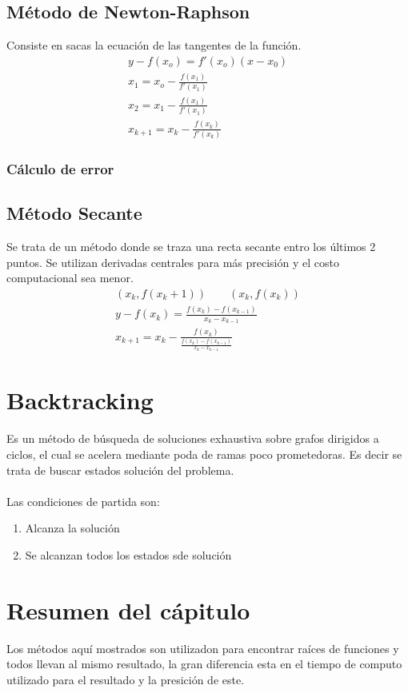 \subsection{M\'etodo de Newton-Raphson}
Consiste en sacas la ecuaci\'on de las tangentes de la funci\'on.
\begin{gather}
y-f(x_o)=f'(x_o)(x-x_0) \\
x_1=x_o-\frac{f(x_1)}{f'(x_1)} \\
x_2=x_1-\frac{f(x_1)}{f'(x_1)} \\
\boxed{x_{k+1}=x_k-\frac{f(x_k)}{f'(x_k)}}
\end{gather}
\subsubsection*{C\'alculo de error}

\subsection{M\'etodo Secante}
Se trata de un m\'etodo donde se traza una recta secante entro los \'ultimos 2 puntos. Se utilizan derivadas centrales para m\'as precisi\'on y el costo computacional sea menor.
\begin{gather}
\nonumber(x_k,f(x_k+1)) \qquad (x_k,f(x_k))\\
y-f(x_k)=\frac{f(x_k)-f(x_{k-1})}{x_k-x_{k-1}}\\
\boxed{x_{k+1}=x_k-\frac{f(x_k)}{\frac{f(x_k)-f(x_{k-1})}{x_k-x_{k-1}}}}
\end{gather}
\section*{Backtracking}
Es un m\'etodo de b\'usqueda de soluciones exhaustiva sobre grafos dirigidos a ciclos, el cual se acelera mediante poda de ramas poco prometedoras. Es decir se trata de buscar estados soluci\'on del problema. \\
\\
Las condiciones de partida son:
\begin{enumerate}
\item Alcanza la soluci\'on
\item Se alcanzan todos los estados sde soluci\'on
\end{enumerate}


\section*{Resumen del c\'apitulo}
Los m\'etodos aqu\'i mostrados son utilizadon para encontrar ra\'ices de funciones y todos llevan al mismo resultado, la gran diferencia esta en el tiempo de computo utilizado para el resultado y la presici\'on de este.\\
\\
